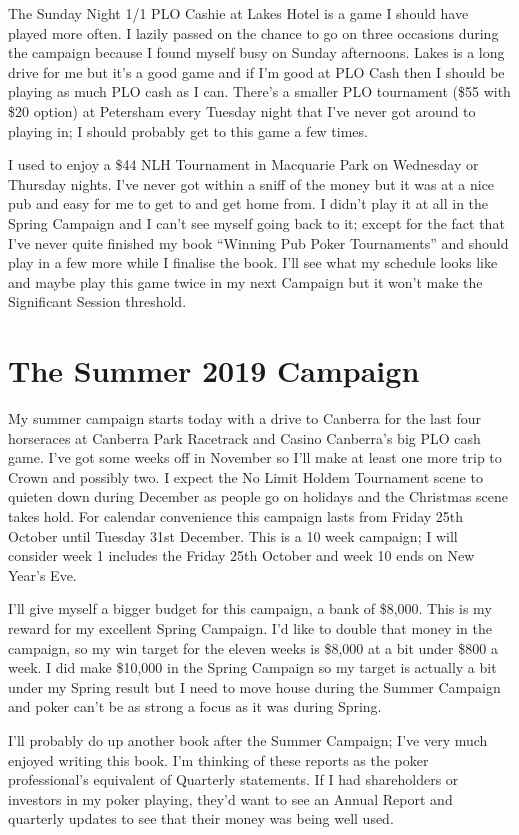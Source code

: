 The Sunday Night 1/1 PLO Cashie at Lakes Hotel is a game I should have
played more often. I lazily passed on the chance to go on three
occasions during the campaign because I found myself busy on Sunday
afternoons. Lakes is a long drive for me but it's a good game and if
I'm good at PLO Cash then I should be playing as much PLO cash as I
can. There's a smaller PLO tournament (\$55 with \$20 option) at
Petersham every Tuesday night that I've never got around to playing
in; I should probably get to this game a few times.

I used to enjoy a \$44 NLH Tournament in Macquarie Park on Wednesday
or Thursday nights. I've never got within a sniff of the money but it
was at a nice pub and easy for me to get to and get home from. I
didn't play it at all in the Spring Campaign and I can't see myself
going back to it; except for the fact that I've never quite finished
my book ``Winning Pub Poker Tournaments'' and should play in a few
more while I finalise the book. I'll see what my schedule looks like
and maybe play this game twice in my next Campaign but it won't make
the Significant Session threshold.

\section*{The Summer 2019 Campaign}

My summer campaign starts today with a drive to Canberra for the
last four horseraces at Canberra Park Racetrack and Casino Canberra's
big PLO cash game. I've got some weeks off in November so I'll make
at least one more trip to Crown and possibly two. I expect the No
Limit Holdem Tournament scene to quieten down during December as
people go on holidays and the Christmas scene takes hold. For calendar
convenience this campaign lasts from Friday 25th October until Tuesday
31st December. This is a 10 week campaign; I will consider week 1
includes the Friday 25th October and week 10 ends on New Year's Eve.

I'll give myself a bigger budget for this campaign, a bank of
\$8,000. This is my reward for my excellent Spring Campaign. I'd like
to double that money in the campaign, so my win target for the eleven
weeks is \$8,000 at a bit under \$800 a week. I did make \$10,000 in
the Spring Campaign so my target is actually a bit under my Spring
result but I need to move house during the Summer Campaign and poker
can't be as strong a focus as it was during Spring.

I'll probably do up another book after the Summer Campaign; I've very
much enjoyed writing this book. I'm thinking of these reports as the
poker professional's equivalent of Quarterly statements. If I had
shareholders or investors in my poker playing, they'd want to see an
Annual Report and quarterly updates to see that their money was being
well used.
